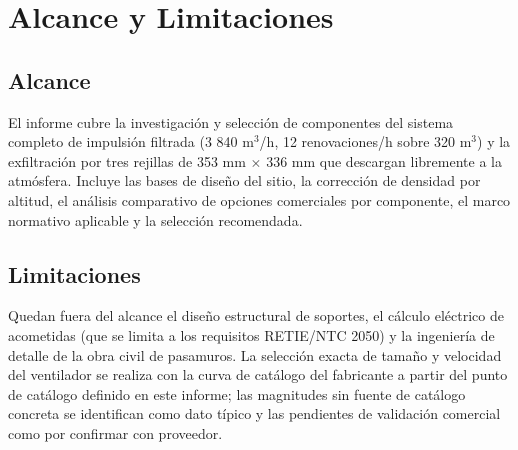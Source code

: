\section{Alcance y Limitaciones}

\subsection{Alcance}

El informe cubre la investigación y selección de componentes del sistema completo de impulsión filtrada (3 840 m$^3$/h, 12 renovaciones/h sobre 320 m$^3$) y la exfiltración por tres rejillas de 353 mm $\times$ 336 mm que descargan libremente a la atmósfera. Incluye las bases de diseño del sitio, la corrección de densidad por altitud, el análisis comparativo de opciones comerciales por componente, el marco normativo aplicable y la selección recomendada.

\subsection{Limitaciones}

Quedan fuera del alcance el diseño estructural de soportes, el cálculo eléctrico de acometidas (que se limita a los requisitos RETIE/NTC 2050) y la ingeniería de detalle de la obra civil de pasamuros. La selección exacta de tamaño y velocidad del ventilador se realiza con la curva de catálogo del fabricante a partir del punto de catálogo definido en este informe; las magnitudes sin fuente de catálogo concreta se identifican como dato típico y las pendientes de validación comercial como por confirmar con proveedor.
